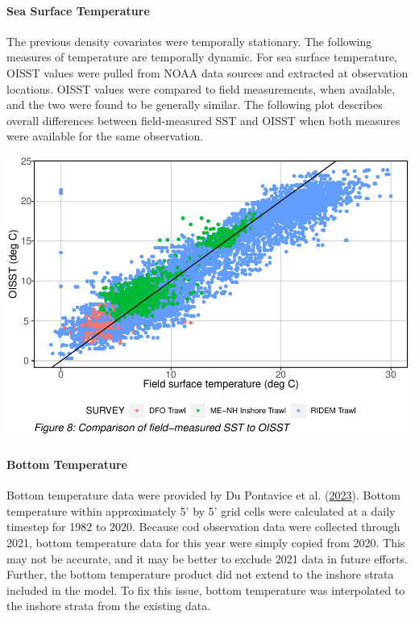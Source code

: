 \documentclass[
]{article}
\begin{document}
\hypertarget{sea-surface-temperature}{%
\paragraph{Sea Surface Temperature}\label{sea-surface-temperature}}

The previous density covariates were temporally stationary. The following measures of temperature are temporally dynamic. For sea surface temperature, OISST values were pulled from NOAA data sources and extracted at observation locations. OISST values were compared to field measurements, when available, and the two were found to be generally similar. The following plot describes overall differences between field-measured SST and OISST when both measures were available for the same observation.

\includegraphics{ToR1_TechPaper_files/figure-latex/oisst-1.pdf}

\hypertarget{bottom-temperature}{%
\paragraph{Bottom Temperature}\label{bottom-temperature}}

Bottom temperature data were provided by Du Pontavice et al. (\protect\hyperlink{ref-du_pontavice_2023}{2023}). Bottom temperature within approximately 5' by 5' grid cells were calculated at a daily timestep for 1982 to 2020. Because cod observation data were collected through 2021, bottom temperature data for this year were simply copied from 2020. This may not be accurate, and it may be better to exclude 2021 data in future efforts. Further, the bottom temperature product did not extend to the inshore strata included in the model. To fix this issue, bottom temperature was interpolated to the inshore strata from the existing data.
\end{document}
